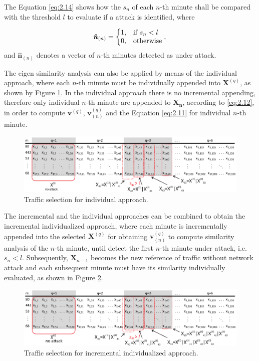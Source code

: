 The Equation \ref{eq:2.14} shows how the $s_n$ of each $n$-th minute shall be compared with the threshold $l$ to evaluate if a attack is identified, where

\begin{equation}\label{eq:2.14}
  \hat{\pmb{n}}_{(n)}=\left\{
  \begin{array}{@{}ll@{}}
    1, & \text{if}\ s_n < l \\
    0, & \text{otherwise}
  \end{array}\right.,
\end{equation}
and $\hat{\pmb{n}}_{(n)}$ denotes a vector of $n$-th minutes detected as under attack.

The eigen similarity analysis can also be applied by means of the individual approach, where each $n$-th minute must be individually appended into $\pmb{X}^{(q)}$, as shown by Figure \ref{fig:2.09}. In the individual approach there is no incremental appending, therefore only individual $n$-th minute are appended to $\pmb{X_n}$, according to \ref{eq:2.12}, in order to compute $\pmb{v}^{(q)}$, $\pmb{v}_{(n)}^{(q)}$ and the Equation \ref{eq:2.11} for individual $n$-th minute.

\begin{figure}[h!]
     \includegraphics[width=15cm]{figs/ch2/individualized.eps}
     \caption{Traffic selection for individual approach.}
     \label{fig:2.09}
\end{figure}

The incremental and the individual approaches can be combined to obtain the incremental individualized approach, where each minute is incrementally appended into the selected $\pmb{X}^{(q)}$ for obtaining $\pmb{v}_{(n)}^{(q)}$ to compute similarity analysis of the $n$-th minute, until detect the first $n$-th minute under attack, i.e. $s_n < l$. Subsequently, $\pmb{X}_{n-1}$ becomes the new reference of traffic without network attack and each subsequent minute must have its similarity individually evaluated, as shown in Figure \ref{fig:2.02}.

\begin{figure}[h!]
     \includegraphics[width=15cm]{figs/ch2/incremental_individualized.eps}
     \caption{Traffic selection for incremental individualized approach.}
     \label{fig:2.02}
\end{figure}

